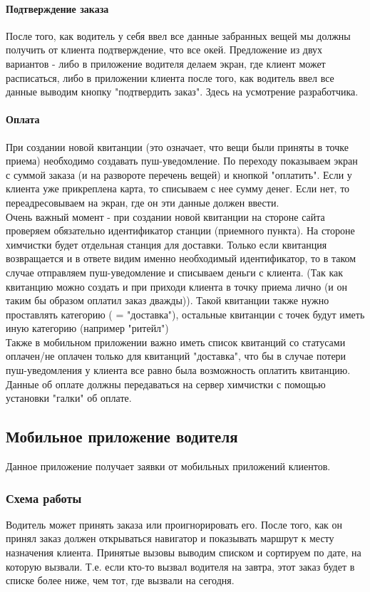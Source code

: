 \documentclass[DIV=calc, paper=a4, fontsize=11pt]{scrartcl} %
\begin{document}
\paragraph{Подтверждение заказа}
После того, как водитель у себя ввел все данные забранных вещей мы должны получить от клиента подтверждение, что все окей. Предложение из двух вариантов - либо в приложение водителя делаем экран, где клиент может расписаться, либо в приложении клиента после того, как водитель ввел все данные выводим кнопку "подтвердить заказ". Здесь на усмотрение разработчика.

\paragraph{Оплата}
При создании новой квитанции (это означает, что вещи были приняты в точке приема) необходимо создавать пуш-уведомление. По переходу показываем экран с суммой заказа (и на развороте перечень вещей) и кнопкой "оплатить". Если у клиента уже прикреплена карта, то списываем с нее сумму денег. Если нет, то переадресовываем на экран, где он эти данные должен ввести.
\\[0.5cm]
Очень важный момент - при создании новой квитанции на стороне сайта проверяем обязательно идентификатор станции (приемного пункта). На стороне химчистки будет отдельная станция для доставки. Только если квитанция возвращается и в ответе видим именно необходимый идентификатор, то в таком случае отправляем пуш-уведомление и списываем деньги с клиента. (Так как квитанцию можно создать и при приходи клиента в точку приема лично (и он таким бы образом оплатил заказ дважды)). Такой квитанции также нужно проставлять категорию ( = "доставка"), остальные квитанции с точек будут иметь иную категорию (например "ритейл")
\\[0.5cm]
Также в мобильном приложении важно иметь список квитанций со статусами оплачен/не оплачен только для квитанций "доставка", что бы в случае потери пуш-уведомления у клиента все равно была возможность оплатить квитанцию.
\\[0.5cm]
Данные об оплате должны передаваться на сервер химчистки с помощью установки "галки" об оплате.

\subsection{Мобильное приложение водителя}
Данное приложение получает заявки от мобильных приложений клиентов. 

\subsubsection{Схема работы}
Водитель может принять заказа или проигнорировать его. После того, как он принял заказ должен открываться навигатор и показывать маршрут к месту назначения клиента. Принятые вызовы выводим списком и сортируем по дате, на которую вызвали. Т.е. если кто-то вызвал водителя на завтра, этот заказ будет в списке более ниже, чем тот, где вызвали на сегодня.
\end{document}
